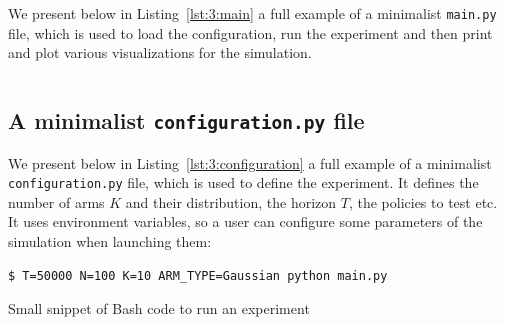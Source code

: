 We present below in Listing~\ref{lst:3:main} a full example of a minimalist \texttt{main.py} file,
which is used to load the configuration, run the experiment and then print and plot various visualizations for the simulation.

\begin{small}
    \inputminted[linenos=true,numbersep=5pt,frame=lines,framesep=2mm]{python3}{2-Chapters/3-Chapter/src/example_of_main_singleplayer.py}
\end{small}


\subsection{A minimalist \texttt{configuration.py} file}

We present below in Listing~\ref{lst:3:configuration} a full example of a minimalist \texttt{configuration.py} file,
which is used to define the experiment.
It defines the number of arms $K$ and their distribution, the horizon $T$, the policies to test etc.
It uses environment variables, so a user can configure some parameters of the simulation when launching them:


\begin{listing}[h!]
    \begin{verbatim}
$ T=50000 N=100 K=10 ARM_TYPE=Gaussian python main.py
    \end{verbatim}
    \caption{Small snippet of Bash code to run an experiment}
    \label{lst:3:howToRunExperiment2}
\end{listing}

\begin{small}
    \inputminted[linenos=true,numbersep=5pt,frame=lines,framesep=2mm]{python3}{2-Chapters/3-Chapter/src/example_of_configuration_singleplayer.py}
\end{small}


